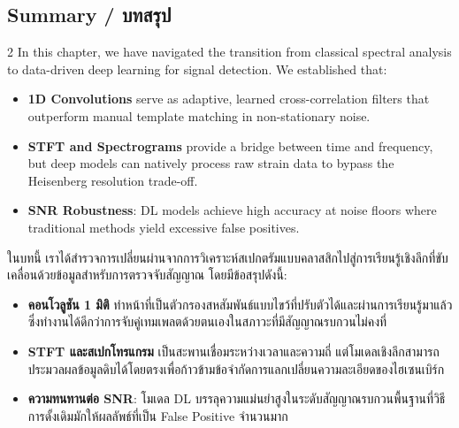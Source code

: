\subsection{Summary \quad / \quad \textthai{บทสรุป}}
\begin{paracol}{2}
In this chapter, we have navigated the transition from classical spectral analysis to data-driven deep learning for signal detection. We established that:
\begin{itemize}
    \item \textbf{1D Convolutions} serve as adaptive, learned cross-correlation filters that outperform manual template matching in non-stationary noise.
    \item \textbf{STFT and Spectrograms} provide a bridge between time and frequency, but deep models can natively process raw strain data to bypass the Heisenberg resolution trade-off.
    \item \textbf{SNR Robustness}: DL models achieve high accuracy at noise floors where traditional methods yield excessive false positives.
\end{itemize}

\switchcolumn

\begin{thai}
ในบทนี้ เราได้สำรวจการเปลี่ยนผ่านจากการวิเคราะห์สเปกตรัมแบบคลาสสิกไปสู่การเรียนรู้เชิงลึกที่ขับเคลื่อนด้วยข้อมูลสำหรับการตรวจจับสัญญาณ โดยมีข้อสรุปดังนี้:
\begin{itemize}
    \item \textbf{คอนโวลูชัน 1 มิติ} ทำหน้าที่เป็นตัวกรองสหสัมพันธ์แบบไขว้ที่ปรับตัวได้และผ่านการเรียนรู้มาแล้ว ซึ่งทำงานได้ดีกว่าการจับคู่เทมเพลตด้วยตนเองในสภาวะที่มีสัญญาณรบกวนไม่คงที่
    \item \textbf{STFT และสเปกโทรแกรม} เป็นสะพานเชื่อมระหว่างเวลาและความถี่ แต่โมเดลเชิงลึกสามารถประมวลผลข้อมูลดิบได้โดยตรงเพื่อก้าวข้ามข้อจำกัดการแลกเปลี่ยนความละเอียดของไฮเซนเบิร์ก
    \item \textbf{ความทนทานต่อ SNR}: โมเดล DL บรรลุความแม่นยำสูงในระดับสัญญาณรบกวนพื้นฐานที่วิธีการดั้งเดิมมักให้ผลลัพธ์ที่เป็น False Positive จำนวนมาก
\end{itemize}
\end{thai}
\end{paracol}
